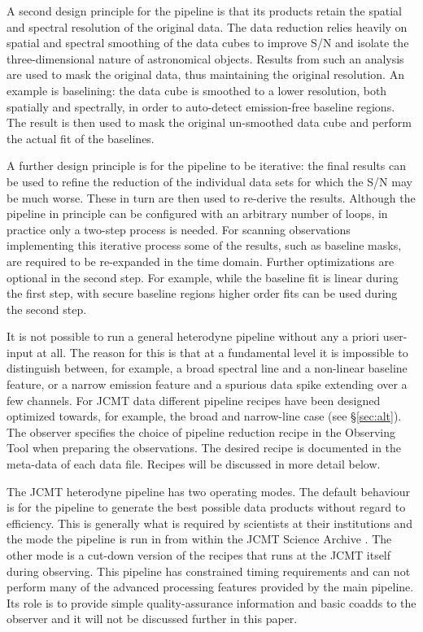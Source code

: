 \documentclass[a4paper,fleqn,usenatbib]{mnras}
\begin{document}
A second design principle for the pipeline is that its products
retain the spatial and spectral resolution of the original data.  The
data reduction relies heavily on spatial and spectral smoothing of the
data cubes to improve S/N and isolate the three-dimensional nature of astronomical
objects. Results from such an analysis are used to mask the original
data, thus maintaining the original resolution. An example is
baselining: the data cube is smoothed to a lower resolution,
both spatially and spectrally, in order to auto-detect emission-free
baseline regions. The result is then used to mask the original
un-smoothed data cube and perform the actual fit of the baselines.

A further design principle is for the pipeline to be iterative: the
final results can be used to refine the reduction of the individual data
sets for which the S/N may be much worse. These in turn are then used
to re-derive the results. Although the pipeline in principle can be
configured with an arbitrary number of loops, in practice only a
two-step process is needed. For scanning observations implementing
this iterative process some of the results, such as baseline masks,
are required to be re-expanded in the time domain. Further optimizations are optional in
the second step. For example, while the baseline fit is linear
during the first step, with secure baseline regions higher order fits
can be used during the second step.

It is not possible to run a general heterodyne pipeline without any a
priori user-input at all. The reason for this is that at a fundamental
level it is impossible to distinguish between, for example, a broad spectral
line and a non-linear baseline feature, or a narrow emission feature
and a spurious data spike extending over a few channels. For JCMT data
different pipeline recipes have been designed optimized towards,
for example, the broad and narrow-line case (see \S\ref{sec:alt}). The observer specifies the choice
of pipeline reduction recipe in the Observing Tool when preparing the
observations. The desired recipe is documented in the meta-data of
each data file. Recipes will be discussed in more detail below.

The JCMT heterodyne pipeline has two operating modes. The default
behaviour is for the pipeline to generate the best possible data
products without regard to efficiency. This is generally what is
required by scientists at their institutions and the mode the pipeline
is run in from within the JCMT Science Archive
\citep[JSA;][]{2015Economou,2008ASPC..394..565J}. The other mode is a
cut-down version of the recipes that runs at the JCMT itself during
observing. This pipeline has constrained timing requirements and can
not perform many of the advanced processing features provided by the
main pipeline. Its role is to provide simple quality-assurance
information and basic coadds to the observer and it will not be
discussed further in this paper.
\end{document}
